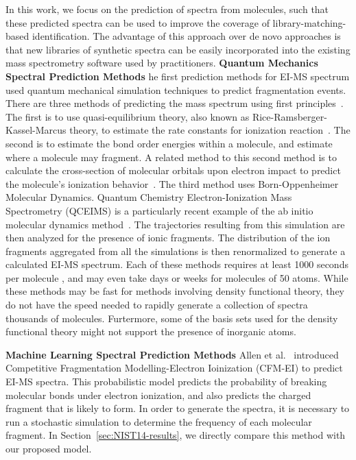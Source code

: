 In this work, we focus on the prediction of spectra from molecules, such that these predicted spectra can be used to improve the coverage of library-matching-based identification. The advantage of this approach over de novo approaches is that new libraries of synthetic spectra can be easily incorporated into the existing mass spectrometry software used by practitioners.
\textbf{Quantum Mechanics Spectral Prediction Methods}
he first prediction methods for EI-MS spectrum used quantum mechanical simulation techniques to predict fragmentation events. There are three methods of predicting the mass spectrum using first principles~\cite{bauer2016compute}.
The first is to use quasi-equilibrium theory, also known as Rice-Ramsberger-Kassel-Marcus theory, to estimate the rate constants for ionization reaction~\cite{lorquet1994whither, lorquet2000landmarks, rosenstock1952absolute}.
The second is to estimate the bond order energies within a molecule, and estimate where a molecule may fragment. A related method to this second method is to calculate the cross-section of molecular orbitals upon electron impact to predict the molecule's ionization behavior~\cite{irikura2017ab, Guerra_BEB_model}.
The third method uses Born-Oppenheimer Molecular Dynamics. Quantum Chemistry Electron-Ionization Mass Spectrometry (QCEIMS) is a particularly recent example of the ab initio molecular dynamics method~\cite{grimme2013towards,Asgeirsson_QCEIMS,bauer2016compute}.
The trajectories resulting from this simulation are then analyzed for the presence of ionic fragments. The distribution of the ion fragments aggregated from all the simulations is then renormalized to generate a calculated EI-MS spectrum.
Each of these methods requires at least 1000 seconds per molecule \cite{allen2016computational}, and may even take days or weeks for molecules of 50 atoms. While these methods may be fast for methods involving density functional theory, they do not have the speed needed to rapidly generate a collection of spectra thousands of molecules. Furtermore, some of the basis sets used for the density functional theory might not support the presence of inorganic atoms.

\textbf{Machine Learning Spectral Prediction Methods} Allen et al.~\cite{allen2016computational} introduced Competitive Fragmentation Modelling-Electron Ioinization (CFM-EI) to predict EI-MS spectra. This probabilistic model predicts the probability of breaking molecular bonds under electron ionization, and also predicts the charged fragment that is likely to form. In order to generate the spectra, it is necessary to run a stochastic simulation to determine the frequency of each molecular fragment.
In Section~\ref{sec:NIST14-results}, we directly compare this method with our proposed model.







